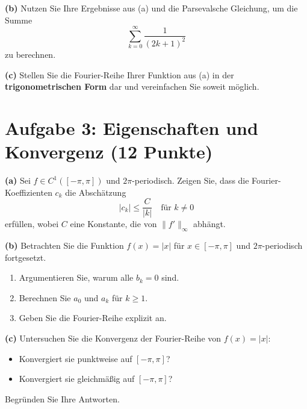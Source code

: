 \textbf{(b)} Nutzen Sie Ihre Ergebnisse aus (a) und die Parsevalsche Gleichung, um die Summe
\[
    \sum_{k=0}^{\infty} \frac{1}{(2k+1)^2}
\]
zu berechnen.

\vspace{0.2cm}

\textbf{(c)} Stellen Sie die Fourier-Reihe Ihrer Funktion aus (a) in der \textbf{trigonometrischen Form} dar und vereinfachen Sie soweit möglich.

\vspace{0.2cm}

\newpage

\section*{Aufgabe 3: Eigenschaften und Konvergenz (12 Punkte)}
\textbf{(a)} Sei $f \in C^1([-\pi, \pi])$ und $2\pi$-periodisch. Zeigen Sie, dass die Fourier-Koeffizienten $c_k$ die Abschätzung
\[
    |c_k| \leq \frac{C}{|k|} \quad \text{für } k \neq 0
\]
erfüllen, wobei $C$ eine Konstante, die von $\|f'\|_\infty$ abhängt.

\vspace{0.2cm}

\textbf{(b)} Betrachten Sie die Funktion $f(x) = |x|$ für $x \in [-\pi, \pi]$ und $2\pi$-periodisch fortgesetzt.

\begin{enumerate}[label=(\roman*)]
    \item Argumentieren Sie, warum alle $b_k = 0$ sind.
    \vspace{0.2cm}
    
    \item Berechnen Sie $a_0$ und $a_k$ für $k \geq 1$.
    \vspace{0.2cm}
    
    \item Geben Sie die Fourier-Reihe explizit an.
    \vspace{0.2cm}
\end{enumerate}

\textbf{(c)} Untersuchen Sie die Konvergenz der Fourier-Reihe von $f(x) = |x|$:
\begin{itemize}
    \item Konvergiert sie punktweise auf $[-\pi, \pi]$?
    \item Konvergiert sie gleichmäßig auf $[-\pi, \pi]$?
\end{itemize}
Begründen Sie Ihre Antworten.

\vspace{0.2cm}

